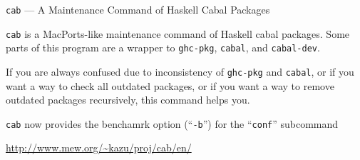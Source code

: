 \begin{hcarentry}[updated]{{\tt cab} --- A Maintenance Command of Haskell Cabal Packages}
\makeheader

{\tt cab} is a MacPorts-like maintenance command of Haskell cabal packages. Some parts of this program are a wrapper to {\tt ghc-pkg}, {\tt cabal}, and {\tt cabal-dev}.

If you are always confused due to inconsistency of {\tt ghc-pkg} and {\tt cabal}, or if you want a way to check all outdated packages, or if you want a way to remove outdated packages recursively, this command helps you.

{\tt cab} now provides the benchamrk option (``{\tt -b}'') for the ``{\tt conf}'' subcommand

\FurtherReading
  \url{http://www.mew.org/~kazu/proj/cab/en/}
\end{hcarentry}
